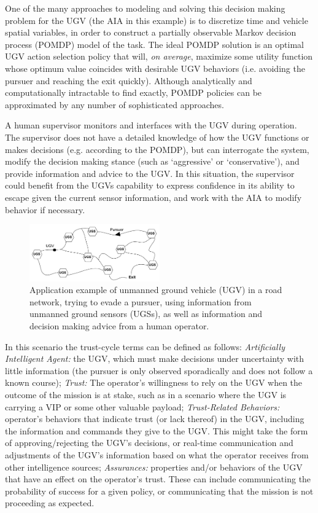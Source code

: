     One of the many approaches to modeling and solving this decision making problem for the UGV (the AIA in this example) is to discretize time and vehicle spatial variables, in order to construct a partially observable Markov decision process (POMDP) model of the task. The ideal POMDP solution is an optimal UGV action selection policy that will, \emph{on average}, maximize some utility function whose optimum value coincides with desirable UGV behaviors (i.e. avoiding the pursuer and reaching the exit quickly). Although analytically and computationally intractable to find exactly, POMDP policies can be approximated by any number of sophisticated approaches.

    A human supervisor monitors and interfaces with the UGV during operation. The supervisor does not have a detailed knowledge of how the UGV functions or makes decisions (e.g. according to the POMDP), but can interrogate the system, modify the decision making stance (such as `aggressive' or `conservative'), and provide information and advice to the UGV. In this situation, the supervisor could benefit from the UGVs capability to express confidence in its ability to escape given the current sensor information, and work with the AIA to modify behavior if necessary. 
    
	\begin{figure}[htbp]
    	\centering
     	\includegraphics[width=0.5\textwidth]{Figures/RoadNet}
    	\caption{Application example of unmanned ground vehicle (UGV) in a road network, trying to evade a pursuer, using information from unmanned ground sensors (UGSs), as well as information and decision making advice from a human operator.} %
        \label{fig:RoadNet}
    \end{figure}

    In this scenario the trust-cycle terms can be defined as follows: \textit{Artificially Intelligent Agent:} the UGV, which must make decisions under uncertainty with little information (the pursuer is only observed sporadically and does not follow a known course); \textit{Trust:} The operator's willingness to rely on the UGV when the outcome of the mission is at stake, such as in a scenario where the UGV is carrying a VIP or some other valuable payload; \textit{Trust-Related Behaviors:} operator's behaviors that indicate trust (or lack thereof) in the UGV, including the information and commands they give to the UGV. This might take the form of approving/rejecting the UGV's decisions, or real-time communication and adjustments of the UGV's information based on what the operator receives from other intelligence sources; \textit{Assurances:} properties and/or behaviors of the UGV that have an effect on the operator's trust. These can include communicating the probability of success for a given policy, or communicating that the mission is not proceeding as expected.

